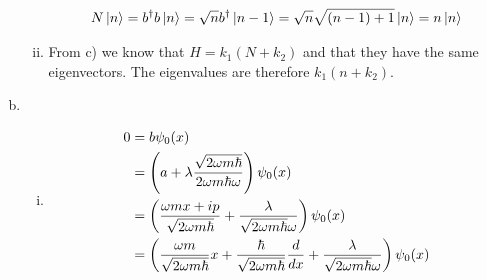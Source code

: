 \documentclass[a4paper,german,12pt,smallheadings]{scrartcl}
\begin{document}
\begin{enumerate}[a)]
\begin{enumerate}[i)]
    \begin{align*}
      N \ket{n} = b^\dagger b \ket{n} = \sqrt{n} b^\dagger \ket{n-1} = \sqrt{n} \sqrt{(n-1)+1} \ket{n} = n \ket{n}
    \end{align*}

  \item
    From c) we know that $H = k_1 (N + k_2)$ and that they have the same
    eigenvectors. The eigenvalues are therefore $k_1(n + k_2)$.

\end{enumerate}
\item
  \begin{enumerate}[i)]
    \item
      \begin{align*}
        0 &= b \psi_0(x) \\
          &= \del{a + \lambda \frac{\sqrt{2 \omega m \hbar}}{2 \omega m \hbar \omega}} \psi_0(x) \\
          &= \del{\frac{\omega m x + i p}{\sqrt{2 \omega m \hbar}} + \frac{\lambda}{\sqrt{2 \omega m \hbar} \omega}} \psi_0(x) \\
          &= \del{\frac{\omega m}{\sqrt{2 \omega m \hbar}} x + \frac{\hbar}{\sqrt{2 \omega m \hbar}} \frac{d}{dx} + \frac{\lambda}{\sqrt{2 \omega m \hbar} \omega}} \psi_0(x)
      \end{align*}
  \end{enumerate}

\end{enumerate}
\end{document}
